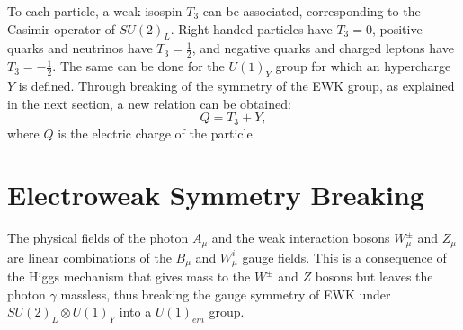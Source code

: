     To each particle, a weak isospin $ T_3 $ can be associated, corresponding to the Casimir operator of $ SU(2)_L $. Right-handed particles have $ T_3 = 0 $, positive quarks and neutrinos have $ T_3 = \frac{1}{2} $, and negative quarks and charged leptons have $ T_3 = - \frac{1}{2} $. The same can be done for the $ U(1)_Y $ group for which an hypercharge $ Y $ is defined. Through breaking of the symmetry of the EWK group, as explained in the next section, a new relation can be obtained:
    \begin{equation}
      Q = T_3 + Y ,
    \end{equation}
    where $ Q $ is the electric charge of the particle.

  \section{Electroweak Symmetry Breaking}

    The physical fields of the photon $ A_\mu $ and the weak interaction bosons $ W^\pm_\mu $ and $ Z_\mu $ are linear combinations of the $ B_\mu $ and $ W^i_\mu $ gauge fields. This is a consequence of the Higgs mechanism that gives mass to the $ W^\pm $ and $ Z $ bosons but leaves the photon $ \gamma $ massless, thus breaking the gauge symmetry of EWK under $ SU(2)_L \otimes U(1)_Y $ into a $ U(1)_{em} $ group. \\

